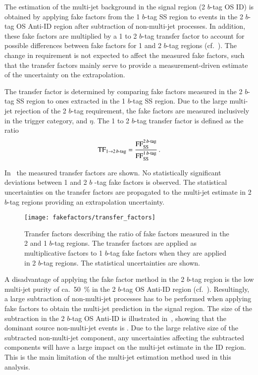 The estimation of the multi-jet background in the \hadhad signal
region (2 $b$-tag OS ID) is obtained by applying fake factors from the
1 $b$-tag SS region to events in the 2 $b$-tag OS Anti-ID region after
subtraction of non-multi-jet processes. In addition, these fake
factors are multiplied by a 1 to 2 $b$-tag transfer factor to account
for possible differences between fake factors for 1 and 2 $b$-tag
regions (cf.\ ). The change in \btag
requirement is not expected to affect the measured fake factors, such
that the transfer factors mainly serve to provide a measurement-driven
estimate of the uncertainty on the extrapolation.

The transfer factor is determined by comparing fake factors measured
in the 2 $b$-tag SS region to ones extracted in the 1 $b$-tag SS
region. Due to the large multi-jet rejection of the 2 $b$-tag
requirement, the fake factors are measured inclusively in the trigger
category, \tauhadvis \pT and \tauhadvis $\eta$. The 1 to 2 $b$-tag
transfer factor is defined as the ratio
\begin{align*}
  \text{TF}_{1 \rightarrow 2\,b\text{-tag}} = \frac{\text{FF}_{\text{SS}}^{2\,b\text{-tag}}}{\text{FF}_{\text{SS}}^{1\,b\text{-tag}}} \,\text{.}
\end{align*}

In~ the measured transfer factors
are shown. No statistically significant deviations between 1 and 2 $b$
-tag fake factors is observed. The statistical uncertainties on the
transfer factors are propagated to the multi-jet estimate in 2 $b$-tag
regions providing an extrapolation uncertainty.


\begin{figure}[htbp]
  \centering

  \texttt{[image: fakefactors/transfer\_factors]}

  \caption{Transfer factors describing the ratio of fake factors
    measured in the 2 and 1 $b$-tag regions. The transfer factors are
    applied as multiplicative factors to 1 $b$-tag fake factors when
    they are applied in 2 $b$-tag regions. The statistical
    uncertainties are shown.}
  \label{fig:mjfakes_transfer_factor}
\end{figure}

A disadvantage of applying the fake factor method in the 2 $b$-tag
region is the low multi-jet purity of ca.\ \SI{50}{\percent} in the 2
$b$-tag OS Anti-ID region (cf.\
). Resultingly, a large subtraction of
non-multi-jet processes has to be performed when applying fake factors
to obtain the multi-jet prediction in the signal region.  The size of
the subtraction in the 2 $b$-tag OS Anti-ID is illustrated
in~, showing that the dominant source
non-multi-jet events is \ttbarFakes. Due to the large relative size of
the subtracted non-multi-jet component, any uncertainties affecting
the subtracted components will have a large impact on the multi-jet
estimate in the ID region. This is the main limitation of the
multi-jet estimation method used in this analysis.

